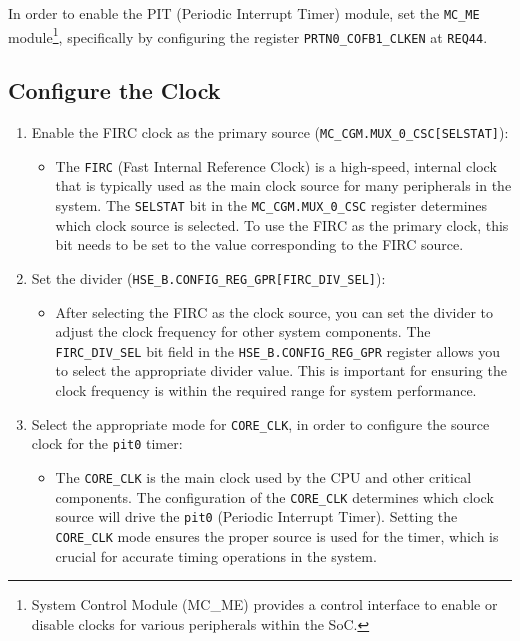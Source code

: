 \vspace{0.2cm}

\noindent In order to enable the PIT (Periodic Interrupt Timer) module, set the \texttt{MC\_ME} module\footnote{System Control Module (MC\_ME) provides a control interface to enable or disable clocks for various peripherals within the SoC.}, specifically by configuring the register \texttt{PRTN0\_COFB1\_CLKEN} at \texttt{REQ44}.


\subsection*{Configure the Clock}
    \begin{enumerate}
        \item Enable the FIRC clock as the primary source (\texttt{MC\_CGM.MUX\_0\_CSC[SELSTAT]}):
            \begin{itemize}
                \item The \texttt{FIRC} (Fast Internal Reference Clock) is a high-speed, internal clock that is typically used as the main clock source for many peripherals in the system. The \texttt{SELSTAT} bit in the \texttt{MC\_CGM.MUX\_0\_CSC} register determines which clock source is selected. To use the FIRC as the primary clock, this bit needs to be set to the value corresponding to the FIRC source.
            \end{itemize}
        \item Set the divider (\texttt{HSE\_B.CONFIG\_REG\_GPR[FIRC\_DIV\_SEL]}):
            \begin{itemize}
                \item After selecting the FIRC as the clock source, you can set the divider to adjust the clock frequency for other system components. The \texttt{FIRC\_DIV\_SEL} bit field in the \texttt{HSE\_B.CONFIG\_REG\_GPR} register allows you to select the appropriate divider value. This is important for ensuring the clock frequency is within the required range for system performance.
            \end{itemize}
        \item Select the appropriate mode for \texttt{CORE\_CLK}, in order to configure the source clock for the \texttt{pit0} timer:
            \begin{itemize}
                \item The \texttt{CORE\_CLK} is the main clock used by the CPU and other critical components. The configuration of the \texttt{CORE\_CLK} determines which clock source will drive the \texttt{pit0} (Periodic Interrupt Timer). Setting the \texttt{CORE\_CLK} mode ensures the proper source is used for the timer, which is crucial for accurate timing operations in the system.

\end{itemize}
\end{enumerate}
